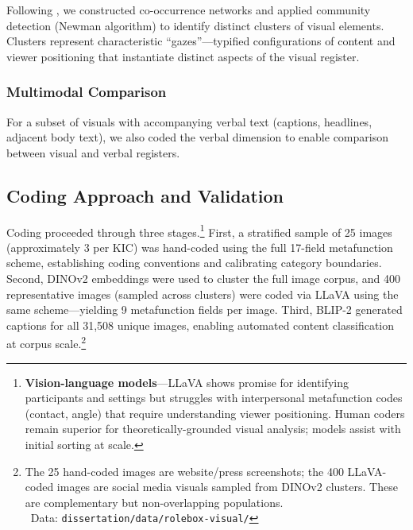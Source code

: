 \documentclass[../main.tex]{subfiles}
\begin{document}
Following \cite{hollerer2013imageries}, we constructed co-occurrence networks and applied community detection (Newman algorithm) to identify distinct clusters of visual elements. Clusters represent characteristic ``gazes''---typified configurations of content and viewer positioning that instantiate distinct aspects of the visual register.

\subsubsection{Multimodal Comparison}

For a subset of visuals with accompanying verbal text (captions, headlines, adjacent body text), we also coded the verbal dimension to enable comparison between visual and verbal registers.

\subsection{Coding Approach and Validation}

Coding proceeded through three stages.\footnote{\textbf{Vision-language models}---LLaVA shows promise for identifying participants and settings but struggles with interpersonal metafunction codes (contact, angle) that require understanding viewer positioning. Human coders remain superior for theoretically-grounded visual analysis; models assist with initial sorting at scale.} First, a stratified sample of 25 images (approximately 3 per KIC) was hand-coded using the full 17-field metafunction scheme, establishing coding conventions and calibrating category boundaries. Second, DINOv2 embeddings were used to cluster the full image corpus, and 400 representative images (sampled across clusters) were coded via LLaVA using the same scheme---yielding 9 metafunction fields per image. Third, BLIP-2 generated captions for all 31,508 unique images, enabling automated content classification at corpus scale.\footnote{The 25 hand-coded images are website/press screenshots; the 400 LLaVA-coded images are social media visuals sampled from DINOv2 clusters. These are complementary but non-overlapping populations.\\\iconvisual\ Data: \texttt{dissertation/data/rolebox-visual/}}
\end{document}
